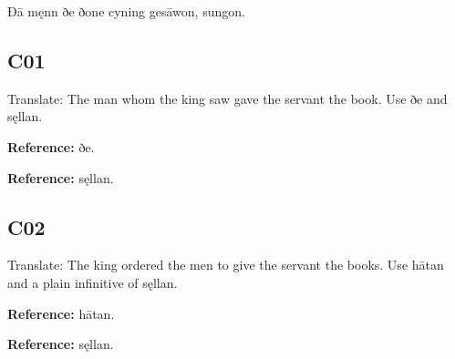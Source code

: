 Ðā męnn ðe ðone cyning gesāwon, sungon.




\subsection*{C01}

Translate: The man whom the king saw gave the servant the book. Use ðe and sęllan.

\textbf{Reference:} ðe.

\textbf{Reference:} sęllan.


\subsection*{C02}

Translate: The king ordered the men to give the servant the books. Use hātan and a plain infinitive of sęllan.

\textbf{Reference:} hātan.

\textbf{Reference:} sęllan.


